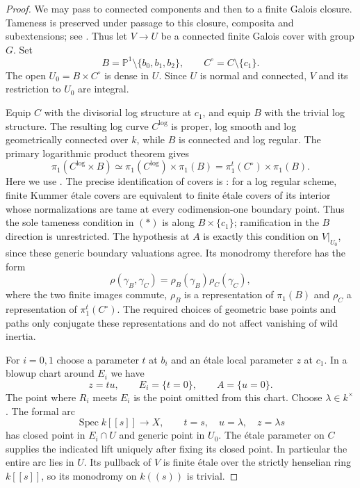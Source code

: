\begin{proof}
We may pass to connected components and then to a finite Galois
closure.  Tameness is preserved under passage to this closure,
composita and subextensions; see
\cite[section 15.116, Lemmas 15.116.5--9]{StacksBIndexTame}.
Thus let $V\to U$ be a connected finite Galois cover with group $G$.
Set
\[
 B=\mathbb P^1\setminus\{b_0,b_1,b_2\},
 \qquad C^\circ=C\setminus\{c_1\}.
\]
The open $U_0=B\times C^\circ$ is dense in $U$.  Since $U$ is
normal and connected, $V$ and its restriction to $U_0$ are integral.

Equip $C$ with the divisorial log structure at $c_1$, and equip
$B$ with the trivial log structure.  The resulting log curve
$C^{\log}$ is proper, log smooth and log geometrically connected
over $k$, while $B$ is connected and log regular.  The primary
logarithmic product theorem gives
\[
 \pi_1(C^{\log}\times B)
   \simeq \pi_1(C^{\log})\times\pi_1(B)
   =\pi_1^t(C^\circ)\times\pi_1(B).
 \tag{*}
\]
Here we use \cite[Proposition 2.4, printed pp.~16--17]{Hoshi2006B}.
The precise identification of covers is
\cite[Proposition A.10, printed pp.~57--58]{Hoshi2006B}: for a log
regular scheme, finite Kummer \'etale covers are equivalent to
finite \'etale covers of its interior whose normalizations are tame
at every codimension-one boundary point.  Thus the sole tameness
condition in $(*)$ is along $B\times\{c_1\}$; ramification in the
$B$ direction is unrestricted.  The hypothesis at $A$ is exactly
this condition on $V|_{U_0}$, since these generic boundary valuations
agree.  Its monodromy therefore has the form
\[
 \rho(\gamma_B,\gamma_C)
     =\rho_B(\gamma_B)\rho_C(\gamma_C),
\]
where the two finite images commute, $\rho_B$ is a representation
of $\pi_1(B)$ and $\rho_C$ a representation of $\pi_1^t(C^\circ)$.
The required choices of geometric base points and paths only
conjugate these representations and do not affect vanishing of
wild inertia.

For $i=0,1$ choose a parameter $t$ at $b_i$ and an \'etale local
parameter $z$ at $c_1$.  In a blowup chart around $E_i$ we have
\[
 z=tu,\qquad E_i=\{t=0\},\qquad A=\{u=0\}.
\]
The point where $R_i$ meets $E_i$ is the point omitted from this
chart.  Choose $\lambda\in k^\times$.  The formal arc
\[
 \operatorname{Spec}k[[s]]\longrightarrow X,
 \qquad t=s,\quad u=\lambda,\quad z=\lambda s
\]
has closed point in $E_i\cap U$ and generic point in $U_0$.
The \'etale parameter on $C$ supplies the indicated lift uniquely
after fixing its closed point.  In particular the entire arc lies
in $U$.  Its pullback of $V$ is finite \'etale over the strictly
henselian ring $k[[s]]$, so its monodromy on $k((s))$ is trivial.


\end{proof}
